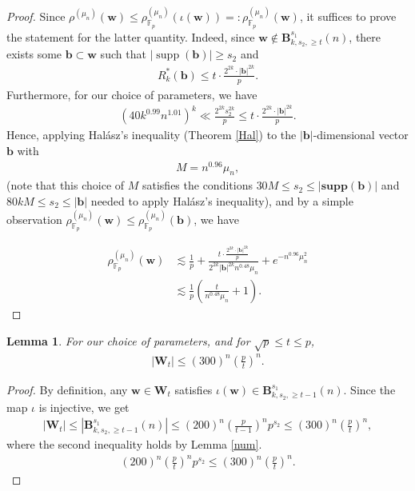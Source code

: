 \documentclass{article}
\numberwithin{equation}{section}
\theoremstyle{plain}
\newtheorem{lemma}{Lemma}[section]
\begin{document}
\begin{proof}
Since $\rho^{(\mu_{n})}(\boldsymbol{w}) \leq \rho^{(\mu_{n})}_{\mathbb{F}_p}(\iota(\boldsymbol{w}))=: \rho^{(\mu_{n})}_{\mathbb{F}_p}(\boldsymbol{w})$, it suffices to prove the statement for the latter quantity. Indeed, since $\boldsymbol{w} \notin \boldsymbol{B}_{k, s_2, \geq t}^{s_1}(n)$, there exists some $\boldsymbol{b} \subset \boldsymbol{w}$ such that $|\operatorname{supp}(\boldsymbol{b})| \geq s_2$ and
\begin{align*}
R_k^*(\boldsymbol{b}) \leq t \cdot \frac{2^{2 k} \cdot|\boldsymbol{b}|^{2 k}}{p}.
\end{align*}
Furthermore, for our choice of parameters, we have
\begin{align*}
\left(40 k^{0.99} n^{1.01}\right)^k \ll \frac{2^{2 k} s_2^{2 k}}{p} \leq t \cdot \frac{2^{2 k} \cdot|\boldsymbol{b}|^{2 k}}{p}.
\end{align*}
Hence, applying Hal\'{a}sz's inequality (Theorem \ref{Hal}) to the $|\boldsymbol{b}|$-dimensional vector $\boldsymbol{b}$ with
\begin{align*}
M=n^{0.96}\mu_{n},
\end{align*}
(note that this choice of $M$ satisfies the conditions $30 M \leq s_2 \leq|\boldsymbol{\textbf{supp}}(\boldsymbol{b})|$ and $80 k M \leq s_2 \leq|\boldsymbol{b}|$ needed to apply Hal\'{a}sz's inequality), and by a simple observation $\rho^{(\mu_{n})}_{\mathbb{F}_p}(\boldsymbol{w}) \leq \rho^{(\mu_{n})}_{\mathbb{F}_p}(\boldsymbol{b})$, we have

\begin{align*}
\rho^{(\mu_n)}_{\mathbb{F}_p}(\boldsymbol{w}) & \lesssim \frac{1}{p}+\frac{t \cdot \frac{2^{2 k} \cdot|\boldsymbol{b}|^{2 k}}{p}}{2^{2 k}|\boldsymbol{b}|^{2 k} n^{0.48}\mu_{n}}+e^{-n^{0.96}\mu_{n}^2} \\
& \lesssim \frac{1}{p}\left(\frac{t}{n^{0.48}\mu_{n}}+1\right).
\end{align*}
\end{proof}
\begin{lemma}\label{lem48}
For our choice of parameters, and for $\sqrt{p} \leq t \leq p$,
\begin{align*}
\left|\boldsymbol{W}_t\right| \leq(300)^n\left(\frac{p}{t}\right)^n.
\end{align*}
\end{lemma}
\begin{proof}
By definition, any $\boldsymbol{w} \in \boldsymbol{W}_t$ satisfies $\iota(\boldsymbol{w}) \in \boldsymbol{B}_{k, s_2, \geq t-1}^{s_1}(n)$. Since the map $\iota$ is injective, we get
\begin{align*}
\left|\boldsymbol{W}_t\right| \leq \left|\boldsymbol{B}_{k, s_2, \geq t-1}^{s_1}(n)\right| \leq (200)^n\left(\frac{p}{t-1}\right)^n p^{s_2} \leq(300)^n\left(\frac{p}{t}\right)^n,
\end{align*}
where the second inequality holds by Lemma \ref{num}.
\begin{align*}
(200)^n\left(\frac{p}{t}\right)^n p^{s_2} \leq(300)^n\left(\frac{p}{t}\right)^n.
\end{align*}
\end{proof}
\end{document}
